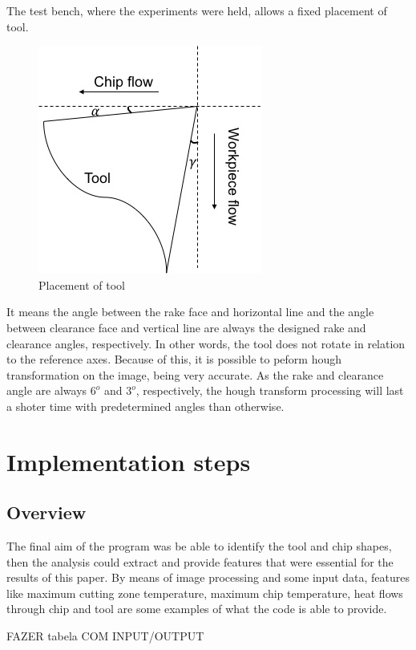 	The test bench, where the experiments were held, allows a fixed placement of tool.

	\begin{figure}[H]
		\centering
		\captionsetup{justification=centering}
		\includegraphics[scale = 0.75]{Cap4/imgset.jpg}
		\caption{Placement of tool}
		\label{fig:imgset}
	\end{figure}

	It means the angle between the rake face and horizontal line and the angle between clearance face and vertical line are always the designed rake and clearance angles, respectively. In other words, the tool does not rotate in relation to the reference axes. Because of this, it is possible to peform hough transformation on the image, being very accurate. As the rake and clearance angle are always $6^{o}$ and $3^{o}$, respectively, the hough transform processing will last a shoter time with predetermined angles than otherwise.

\section{Implementation steps}
	\subsection{Overview}	

	The final aim of the program was be able to identify the tool and chip shapes, then the analysis could extract and provide features that were essential for the results of this paper. By means of image processing and some input data, features like maximum cutting zone temperature, maximum chip temperature, heat flows through chip and tool are some examples of what the code is able to provide.	

	FAZER tabela COM INPUT/OUTPUT
